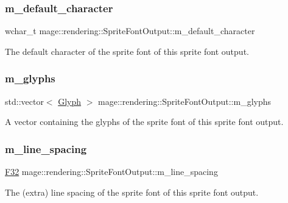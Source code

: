 \subsubsection{\texorpdfstring{m\+\_\+default\+\_\+character}{m\_default\_character}}
{\footnotesize\ttfamily wchar\+\_\+t mage\+::rendering\+::\+Sprite\+Font\+Output\+::m\+\_\+default\+\_\+character}

The default character of the sprite font of this sprite font output. \hypertarget{structmage_1_1rendering_1_1_sprite_font_output_a3ff626faa883b00e94e5dddf94fb013e}{}\label{structmage_1_1rendering_1_1_sprite_font_output_a3ff626faa883b00e94e5dddf94fb013e} 
\subsubsection{\texorpdfstring{m\+\_\+glyphs}{m\_glyphs}}
{\footnotesize\ttfamily std\+::vector$<$ \hyperlink{structmage_1_1rendering_1_1_glyph}{Glyph} $>$ mage\+::rendering\+::\+Sprite\+Font\+Output\+::m\+\_\+glyphs}

A vector containing the glyphs of the sprite font of this sprite font output. \hypertarget{structmage_1_1rendering_1_1_sprite_font_output_a808965bc4ade482ffac0f56bf8013933}{}\label{structmage_1_1rendering_1_1_sprite_font_output_a808965bc4ade482ffac0f56bf8013933} 
\subsubsection{\texorpdfstring{m\+\_\+line\+\_\+spacing}{m\_line\_spacing}}
{\footnotesize\ttfamily \hyperlink{namespacemage_aa97e833b45f06d60a0a9c4fc22ae02c0}{F32} mage\+::rendering\+::\+Sprite\+Font\+Output\+::m\+\_\+line\+\_\+spacing}

The (extra) line spacing of the sprite font of this sprite font output. \hypertarget{structmage_1_1rendering_1_1_sprite_font_output_ab074e7aa56a34898b19172615085045d}{}\label{structmage_1_1rendering_1_1_sprite_font_output_ab074e7aa56a34898b19172615085045d} 
